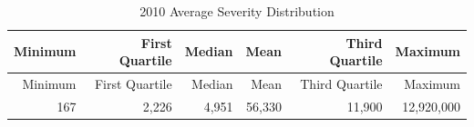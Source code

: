 \documentclass[]{book}
\theoremstyle{definition}
\theoremstyle{definition}
\theoremstyle{definition}
\theoremstyle{remark}
\begin{document}
\begin{longtable}[]{@{}rrrrrr@{}}
\caption{\label{tab:Severity2010} 2010 Average Severity
Distribution}\tabularnewline
\toprule
\begin{minipage}[b]{0.12\columnwidth}\raggedleft\strut
Minimum\strut
\end{minipage} & \begin{minipage}[b]{0.13\columnwidth}\raggedleft\strut
First Quartile\strut
\end{minipage} & \begin{minipage}[b]{0.10\columnwidth}\raggedleft\strut
Median\strut
\end{minipage} & \begin{minipage}[b]{0.10\columnwidth}\raggedleft\strut
Mean\strut
\end{minipage} & \begin{minipage}[b]{0.13\columnwidth}\raggedleft\strut
Third Quartile\strut
\end{minipage} & \begin{minipage}[b]{0.14\columnwidth}\raggedleft\strut
Maximum\strut
\end{minipage}\tabularnewline
\midrule
\endfirsthead
\toprule
\begin{minipage}[b]{0.12\columnwidth}\raggedleft\strut
Minimum\strut
\end{minipage} & \begin{minipage}[b]{0.13\columnwidth}\raggedleft\strut
First Quartile\strut
\end{minipage} & \begin{minipage}[b]{0.10\columnwidth}\raggedleft\strut
Median\strut
\end{minipage} & \begin{minipage}[b]{0.10\columnwidth}\raggedleft\strut
Mean\strut
\end{minipage} & \begin{minipage}[b]{0.13\columnwidth}\raggedleft\strut
Third Quartile\strut
\end{minipage} & \begin{minipage}[b]{0.14\columnwidth}\raggedleft\strut
Maximum\strut
\end{minipage}\tabularnewline
\midrule
\endhead
\begin{minipage}[t]{0.12\columnwidth}\raggedleft\strut
167\strut
\end{minipage} & \begin{minipage}[t]{0.13\columnwidth}\raggedleft\strut
2,226\strut
\end{minipage} & \begin{minipage}[t]{0.10\columnwidth}\raggedleft\strut
4,951\strut
\end{minipage} & \begin{minipage}[t]{0.10\columnwidth}\raggedleft\strut
56,330\strut
\end{minipage} & \begin{minipage}[t]{0.13\columnwidth}\raggedleft\strut
11,900\strut
\end{minipage} & \begin{minipage}[t]{0.14\columnwidth}\raggedleft\strut
12,920,000\strut
\end{minipage}\tabularnewline
\bottomrule
\end{longtable}
\end{document}
